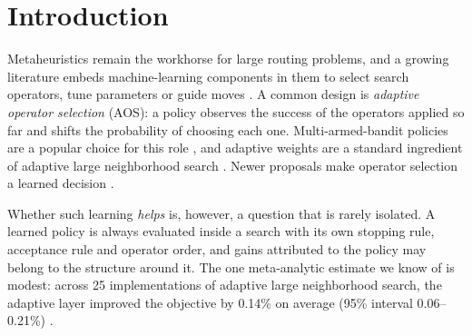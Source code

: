 \section{Introduction}\label{sec:intro}

Metaheuristics remain the workhorse for large routing problems, and a growing literature embeds machine-learning components in them to select search operators, tune parameters or guide moves \citep{karimimamaghan2022,bengio2021}. A common design is \emph{adaptive operator selection} (AOS): a policy observes the success of the operators applied so far and shifts the probability of choosing each one. Multi-armed-bandit policies are a popular choice for this role \citep{dacosta2008,fialho2010,lagos2024}, and adaptive weights are a standard ingredient of adaptive large neighborhood search \citep{ropke2006}. Newer proposals make operator selection a learned decision \citep{karimimamaghan2023,pei2023,xu2025}.

Whether such learning \emph{helps} is, however, a question that is rarely isolated. A learned policy is always evaluated inside a search with its own stopping rule, acceptance rule and operator order, and gains attributed to the policy may belong to the structure around it. The one meta-analytic estimate we know of is modest: across 25 implementations of adaptive large neighborhood search, the adaptive layer improved the objective by 0.14\% on average (95\% interval 0.06--0.21\%) \citep{turkes2021}.

